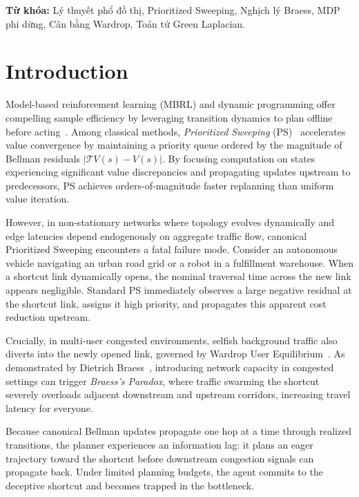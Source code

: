 \documentclass[11pt,a4paper]{article}
\begin{document}
\vspace{0.5em}
\noindent\textbf{Từ khóa:} Lý thuyết phổ đồ thị, Prioritized Sweeping, Nghịch lý Braess, MDP phi dừng, Cân bằng Wardrop, Toán tử Green Laplacian.

\newpage

\section{Introduction}
\label{sec:intro}

Model-based reinforcement learning (MBRL) and dynamic programming offer compelling sample efficiency by leveraging transition dynamics to plan offline before acting~\cite{sutton2018reinforcement}. Among classical methods, \textit{Prioritized Sweeping} (PS)~\cite{peng1993efficient,moore1993prioritized} accelerates value convergence by maintaining a priority queue ordered by the magnitude of Bellman residuals $|\mathcal{T}V(s) - V(s)|$. By focusing computation on states experiencing significant value discrepancies and propagating updates upstream to predecessors, PS achieves orders-of-magnitude faster replanning than uniform value iteration.

However, in non-stationary networks where topology evolves dynamically and edge latencies depend endogenously on aggregate traffic flow, canonical Prioritized Sweeping encounters a fatal failure mode. Consider an autonomous vehicle navigating an urban road grid or a robot in a fulfillment warehouse. When a shortcut link dynamically opens, the nominal traversal time across the new link appears negligible. Standard PS immediately observes a large negative residual at the shortcut link, assigns it high priority, and propagates this apparent cost reduction upstream. 

Crucially, in multi-user congested environments, selfish background traffic also diverts into the newly opened link, governed by Wardrop User Equilibrium~\cite{wardrop1952road}. As demonstrated by Dietrich Braess~\cite{braess1968paradoxon}, introducing network capacity in congested settings can trigger \textit{Braess's Paradox}, where traffic swarming the shortcut severely overloads adjacent downstream and upstream corridors, increasing travel latency for everyone.

Because canonical Bellman updates propagate one hop at a time through realized transitions, the planner experiences an information lag: it plans an eager trajectory toward the shortcut before downstream congestion signals can propagate back. Under limited planning budgets, the agent commits to the deceptive shortcut and becomes trapped in the bottleneck.
\end{document}
